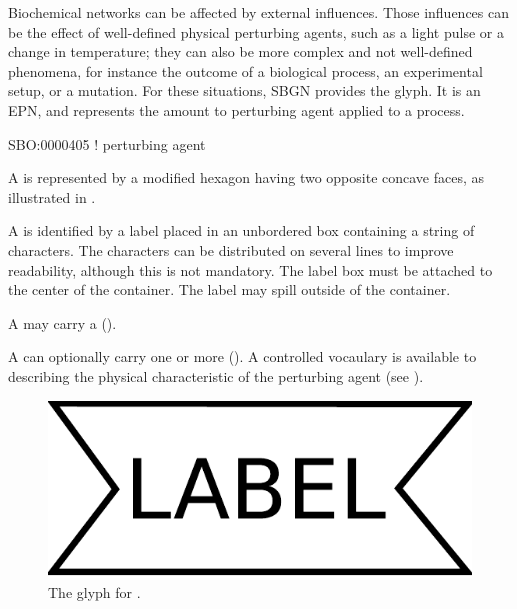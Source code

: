 Biochemical networks can be affected by external influences.  Those
influences can be the effect of well-defined physical perturbing agents, such as a light
pulse or a change in temperature; they can also be more complex and not
well-defined phenomena, for instance the outcome of a biological process, an experimental
setup, or a mutation.  For these situations, SBGN provides the
 glyph. It is an EPN, and represents the amount to perturbing agent applied to a process.  

\begin{glyphDescription}


\glyphSboTerm SBO:0000405 ! perturbing agent

\glyphContainer A  is represented by a modified hexagon
having two opposite concave faces, as illustrated in .

\glyphLabel A  is identified by a label placed in an
unbordered box containing a string of characters.  The characters can be
distributed on several lines to improve readability, although this is not
mandatory.  The label box must be attached to the center of the
 container.  The label may spill outside of the container.

\glyphAux A  may carry a 
().

A  can optionally carry one or more  ().  A controlled vocaulary is available to describing the physical characteristic of the perturbing agent (see ).  

\end{glyphDescription}

\begin{figure}[H]
  \centering
  \includegraphics[scale = 0.3]{images/perturbing_agent}
  \caption{The \PD glyph for .}
  \label{fig:perturbing agent}
\end{figure}

